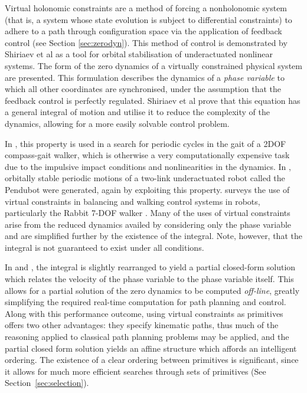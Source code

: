 Virtual holonomic constraints are a method of forcing a nonholonomic system (that is, a system whose state evolution is subject to differential constraints) to adhere to a path through configuration space via the application of feedback control (see Section \ref{sec:zerodyn}). This method of control is demonstrated by Shiriaev et al \cite{shiriaev2005constructive} as a tool for orbital stabilisation of underactuated nonlinear systems. The form of the zero dynamics of a virtually constrained physical system are presented. This formulation describes the dynamics of a \textit{phase variable} to which all other coordinates are synchronised, under the assumption that the feedback control is perfectly regulated. Shiriaev et al prove that this equation has a general integral of motion and utilise it to reduce the complexity of the dynamics, allowing for a more easily solvable control problem. 

In \cite{freidovich2009passive}, this property is used in a search for periodic cycles in the gait of a 2DOF compass-gait walker, which is otherwise a very computationally expensive task due to the impulsive impact conditions and nonlinearities in the dynamics. In \cite{freidovich2008periodic}, orbitally stable periodic motions of a two-link underactuated robot called the Pendubot were generated, again by exploiting this property. \cite{canudas2004concept} surveys the use of virtual constraints in balancing and walking control systems in robots, particularly the Rabbit 7-DOF walker \cite{chevallereau2003rabbit}. Many of the uses of virtual constraints arise from the reduced dynamics availed by considering only the phase variable and are simplified further by the existence of the integral. Note, however, that the integral is not guaranteed to exist under all conditions.

In \cite{manchester2011stable} and \cite{manchester13planning}, the integral is slightly rearranged to yield a partial closed-form solution which relates the velocity of the phase variable to the phase variable itself. This allows for a partial solution of the zero dynamics to be computed \textit{off-line}, greatly simplifying the required real-time computation for path planning and control. Along with this performance outcome, using virtual constraints as primitives offers two other advantages: they specify kinematic paths, thus much of the reasoning applied to classical path planning problems may be applied, and the partial closed form solution yields an affine structure which affords an intelligent ordering. The existence of a clear ordering between primitives is significant, since it allows for much more efficient searches through sets of primitives (See Section~\ref{sec:selection}).

